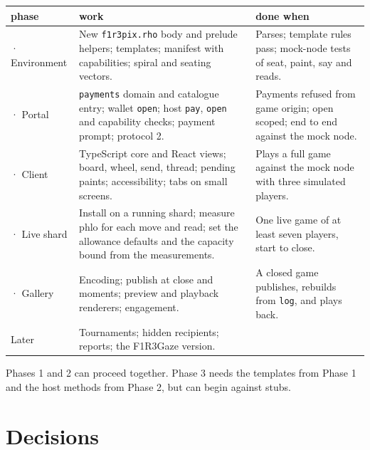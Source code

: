 \documentclass[11pt,a4paper]{article}
\newcommand{\code}[1]{\texttt{#1}}
\begin{document}
\begin{center}\small
\begin{tabularx}{\linewidth}{@{}>{\raggedright\arraybackslash}p{30mm} X >{\raggedright\arraybackslash}p{42mm}@{}}
\toprule
phase & work & done when\\
\midrule
1 · Environment & New \code{f1r3pix.rho} body and prelude helpers; templates; manifest with capabilities; spiral and seating vectors. & Parses; template rules pass; mock-node tests of seat, paint, say and reads.\\
2 · Portal & \code{payments} domain and catalogue entry; wallet \code{open}; host \code{pay}, \code{open} and capability checks; payment prompt; protocol 2. & Payments refused from game origin; open scoped; end to end against the mock node.\\
3 · Client & TypeScript core and React views; board, wheel, send, thread; pending paints; accessibility; tabs on small screens. & Plays a full game against the mock node with three simulated players.\\
4 · Live shard & Install on a running shard; measure phlo for each move and read; set the allowance defaults and the capacity bound from the measurements. & One live game of at least seven players, start to close.\\
5 · Gallery & Encoding; publish at close and moments; preview and playback renderers; engagement. & A closed game publishes, rebuilds from \code{log}, and plays back.\\
Later & Tournaments; hidden recipients; reports; the F1R3Gaze version. & \\
\bottomrule
\end{tabularx}
\end{center}

Phases 1 and 2 can proceed together. Phase 3 needs the templates from Phase 1 and the host
methods from Phase 2, but can begin against stubs.

\section{Decisions}\label{sec:decisions}
\end{document}
